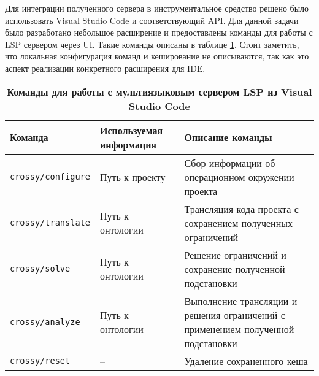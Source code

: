 Для интеграции полученного сервера в инструментальное средство решено было использовать Visual Studio Code и соответствующий
API. Для данной задачи было разработано небольшое расширение и предоставлены команды для работы с LSP сервером
через UI. Такие команды описаны в таблице \ref{lsp-methods}. Стоит заметить, что локальная конфигурация команд и кеширование
не описываются, так как это аспект реализации конкретного расширения для IDE.

\begin{table}[H]
    \caption{\textbf{Команды для работы с мультиязыковым сервером LSP из Visual Studio Code}}
    \begin{tabular}{|p{4cm}|p{4cm}|p{7cm}|}
    \hline \textbf{Команда} & \textbf{Используемая информация} & \textbf{Описание команды} \\ 
    \hline \texttt{crossy/configure} & Путь к проекту & Сбор информации об операционном окружении проекта \\
    \hline \texttt{crossy/translate} & Путь к онтологии & Трансляция кода проекта с сохранением полученных ограничений \\
    \hline \texttt{crossy/solve} & Путь к онтологии & Решение ограничений и сохранение полученной подстановки \\
    \hline \texttt{crossy/analyze} & Путь к онтологии & Выполнение трансляции и решения ограничений с применением полученной подстановки \\
    \hline \texttt{crossy/reset} & -- & Удаление сохраненного кеша \\
    \hline
    \end{tabular}\label{lsp-methods}
\end{table}